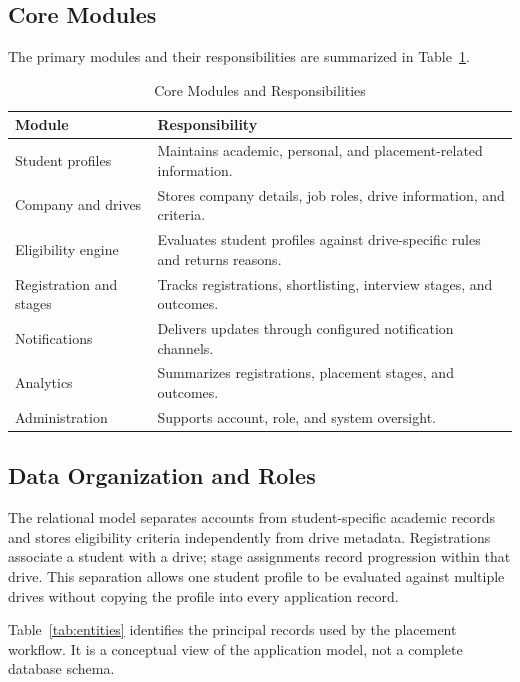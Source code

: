\documentclass[conference,final]{IEEEtran}
\begin{document}
\subsection{Core Modules}
The primary modules and their responsibilities are summarized in Table~\ref{tab:modules}.

\begin{table}[t]
\caption{Core Modules and Responsibilities}
\label{tab:modules}
\centering
\small
\begin{tabular}{p{} p{}}
\toprule
\textbf{Module} & \textbf{Responsibility} \\
\midrule
Student profiles & Maintains academic, personal, and placement-related information. \\
Company and drives & Stores company details, job roles, drive information, and criteria. \\
Eligibility engine & Evaluates student profiles against drive-specific rules and returns reasons. \\
Registration and stages & Tracks registrations, shortlisting, interview stages, and outcomes. \\
Notifications & Delivers updates through configured notification channels. \\
Analytics & Summarizes registrations, placement stages, and outcomes. \\
Administration & Supports account, role, and system oversight. \\
\bottomrule
\end{tabular}
\end{table}

\subsection{Data Organization and Roles}
The relational model separates accounts from student-specific academic records and stores eligibility criteria independently from drive metadata. Registrations associate a student with a drive; stage assignments record progression within that drive. This separation allows one student profile to be evaluated against multiple drives without copying the profile into every application record.

Table~\ref{tab:entities} identifies the principal records used by the placement workflow. It is a conceptual view of the application model, not a complete database schema.
\end{document}
